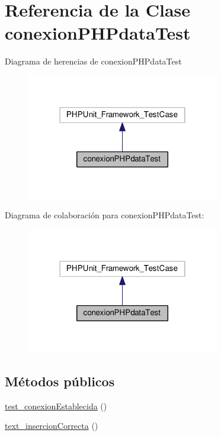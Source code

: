 \hypertarget{classconexionPHPdataTest}{\section{Referencia de la Clase conexion\-P\-H\-Pdata\-Test}
\label{classconexionPHPdataTest}
}


Diagrama de herencias de conexion\-P\-H\-Pdata\-Test\nopagebreak
\begin{figure}[H]
\begin{center}
\leavevmode
\includegraphics[width=238pt]{de/d1e/classconexionPHPdataTest__inherit__graph}
\end{center}
\end{figure}


Diagrama de colaboración para conexion\-P\-H\-Pdata\-Test\-:\nopagebreak
\begin{figure}[H]
\begin{center}
\leavevmode
\includegraphics[width=238pt]{d6/d19/classconexionPHPdataTest__coll__graph}
\end{center}
\end{figure}
\subsection*{Métodos públicos}
\begin{DoxyCompactItemize}
\item 
\hyperlink{classconexionPHPdataTest_ab65520d413ff65609ac54582335c7d87}{test\-\_\-conexion\-Establecida} ()
\item 
\hyperlink{classconexionPHPdataTest_ae53ec32ca0ddcf9a3d07ad1a6bf94211}{text\-\_\-insercion\-Correcta} ()
\end{DoxyCompactItemize}


